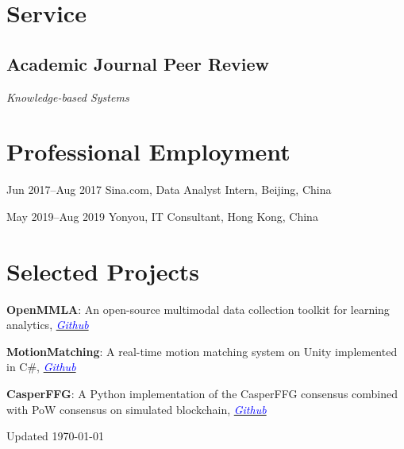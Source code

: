 \documentclass[11pt,letterpaper]{report}
\newcommand{\listitemspace}{0.25em}
\renewenvironment{itemize}
{\begin{list}{}{\setlength{\leftmargin}{0em}
                \setlength{\parskip}{0em}
                \setlength{\itemsep}{\listitemspace}
                \setlength{\parsep}{\listitemspace}}}
{\end{list}}
\begin{document}
    \section*{Service}

    \subsection*{Academic Journal Peer Review}

    \begin{itemize}

        \item \textit{Knowledge-based Systems}

    \end{itemize}


    \section*{Professional Employment}

    \begin{tablist}

        \item[Jun 2017--Aug 2017] \tab{}Sina.com, Data Analyst Intern, Beijing, China
        \item[May 2019--Aug 2019] \tab{}Yonyou, IT Consultant, Hong Kong, China
        
    \end{tablist}

    \section*{Selected Projects}

    \begin{itemize}

        \item \textbf{OpenMMLA}: An open-source multimodal data collection toolkit for learning analytics, \href{https://github.com/ucph-ccs/OpenMMLA}{\textcolor{blue}{\textit{Github}}}
        \item \textbf{MotionMatching}: A real-time motion matching system on Unity implemented in C\#, \href{https://github.com/lizaibeim/motion-matching}{\textcolor{blue}{\textit{Github}}}
        \item \textbf{CasperFFG}: A Python implementation of the CasperFFG consensus combined with PoW consensus on simulated blockchain, \href{https://github.com/lizaibeim/casper-ffg}{\textcolor{blue}{\textit{Github}}}

    \end{itemize}


    \begin{center}
        \vfill
        Updated \monthyeardate\today
    \end{center}
\end{document}
